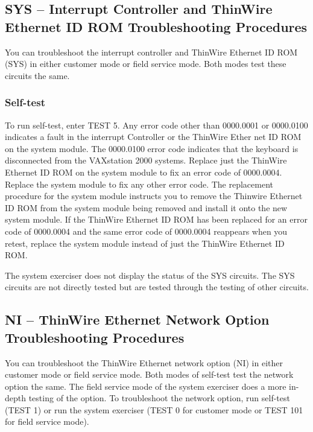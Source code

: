 \subsection{SYS -- Interrupt Controller and ThinWire Ethernet ID ROM Troubleshooting Procedures}

You can troubleshoot the interrupt controller and ThinWire Ethernet ID
ROM (SYS) in either customer mode or field service mode. Both modes
test these circuits the same.

\subsubsection{Self-test}

To run self-test, enter TEST 5.  Any error code other than 0000.0001 or
0000.0100 indicates a fault in the interrupt Controller or the ThinWire Ether
net ID ROM on the system module. The 0000.0100 error code indicates that
the keyboard is disconnected from the VAXstation 2000 systems. Replace
just the ThinWire Ethernet ID ROM on the system module to fix an error
code of 0000.0004. Replace the system module to fix any other error code.
The replacement procedure for the system module instructs you to remove
the Thinwire Ethernet ID ROM from the system module being removed and
install it onto the new system module. If the ThinWire Ethernet ID ROM
has been replaced for an error code of 0000.0004 and the same error code
of 0000.0004 reappears when you retest, replace the system module instead
of just the ThinWire Ethernet ID ROM.

The system exerciser does not display the status of the SYS circuits. The
SYS circuits are not directly tested but are tested through the testing of other
circuits.

\newpage

\subsection{NI -- ThinWire Ethernet Network Option Troubleshooting Procedures}

You can troubleshoot the ThinWire Ethernet network option (NI) in either
customer mode or field service mode. Both modes of self-test test the network 
option the same. The field service mode of the system exerciser does
a more in-depth testing of the option. To troubleshoot the network option,
run self-test (TEST 1) or run the system exerciser (TEST 0 for customer mode
or TEST 101 for field service mode).


